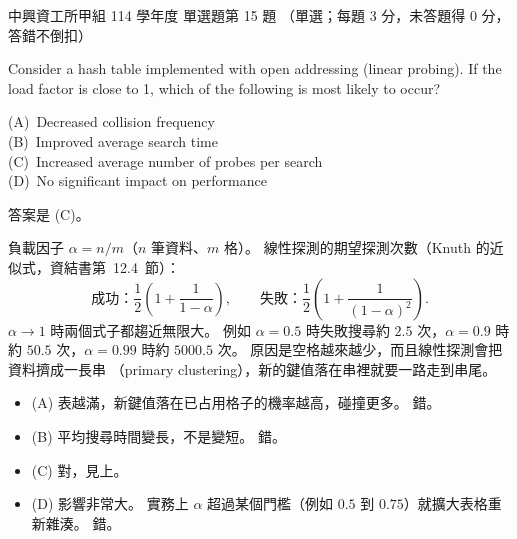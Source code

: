 \begin{pastexam}[label={px:nchu-114-dsa-15}]{中興資工所甲組 114 學年度 單選題第 15 題}
（單選；每題 3 分，未答題得 0 分，答錯不倒扣）

Consider a hash table implemented with open addressing (linear probing). If the load factor is close to 1, which of the following is most likely to occur?

(A)~Decreased collision frequency\\
(B)~Improved average search time\\
(C)~Increased average number of probes per search\\
(D)~No significant impact on performance
\end{pastexam}

\begin{pastsoln}
答案是 (C)。

負載因子 $\alpha = n/m$（$n$ 筆資料、$m$ 格）。 線性探測的期望探測次數（Knuth 的近似式，資結書第~12.4~節）：
\[
\text{成功：} \frac{1}{2}\left(1 + \frac{1}{1 - \alpha}\right), \qquad
\text{失敗：} \frac{1}{2}\left(1 + \frac{1}{(1 - \alpha)^2}\right).
\]
$\alpha \to 1$ 時兩個式子都趨近無限大。 例如 $\alpha = 0.5$ 時失敗搜尋約 $2.5$ 次，$\alpha = 0.9$ 時約
$50.5$ 次，$\alpha = 0.99$ 時約 $5000.5$ 次。 原因是空格越來越少，而且線性探測會把資料擠成一長串
（primary clustering），新的鍵值落在串裡就要一路走到串尾。
\begin{itemize}
\item (A) 表越滿，新鍵值落在已占用格子的機率越高，碰撞更多。 錯。
\item (B) 平均搜尋時間變長，不是變短。 錯。
\item (C) 對，見上。
\item (D) 影響非常大。 實務上 $\alpha$ 超過某個門檻（例如 $0.5$ 到 $0.75$）就擴大表格重新雜湊。 錯。
\end{itemize}
\end{pastsoln}
